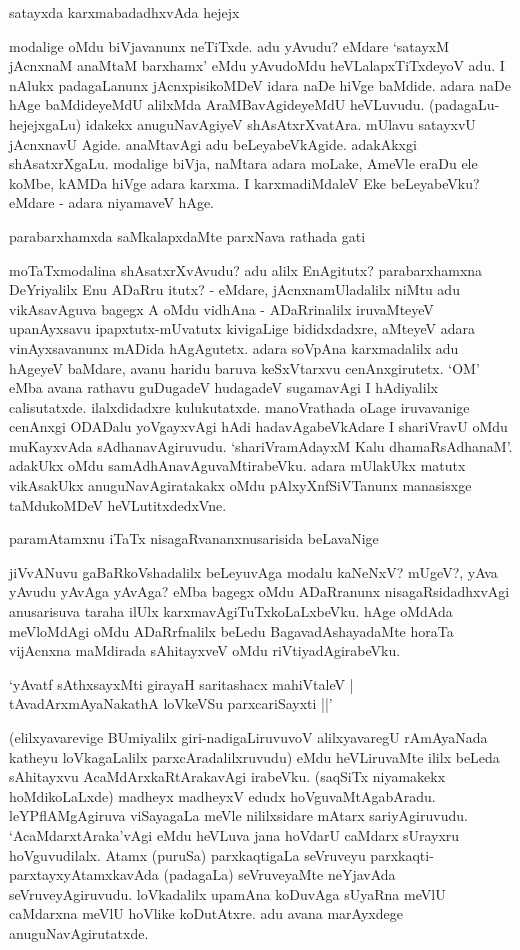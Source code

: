 satayxda karxmabadadhxvAda hejejx

modalige oMdu biVjavanunx neTiTxde. adu yAvudu? eMdare `satayxM jAcnxnaM anaMtaM barxhamx' eMdu yAvudoMdu heVLalapxTiTxdeyoV adu. I nAlukx padagaLanunx jAcnxpisikoMDeV idara naDe hiVge baMdide. adara naDe hAge baMdideyeMdU alilxMda AraMBavAgideyeMdU heVLuvudu. (padagaLu-hejejxgaLu) idakekx anuguNavAgiyeV shAsAtxrXvatAra. mUlavu satayxvU jAcnxnavU Agide. anaMtavAgi adu beLeyabeVkAgide. adakAkxgi shAsatxrXgaLu. modalige biVja, naMtara adara moLake, AmeVle eraDu ele koMbe, kAMDa hiVge adara karxma. I karxmadiMdaleV Eke beLeyabeVku? eMdare - adara niyamaveV hAge.

parabarxhamxda saMkalapxdaMte parxNava rathada gati

moTaTxmodalina shAsatxrXvAvudu? adu alilx EnAgitutx? parabarxhamxna DeYriyalilx Enu ADaRru itutx? - eMdare, jAcnxnamUladalilx niMtu adu vikAsavAguva bagegx A oMdu vidhAna - ADaRrinalilx iruvaMteyeV upanAyxsavu ipapxtutx-mUvatutx kivigaLige bididxdadxre, aMteyeV adara vinAyxsavanunx mADida hAgAgutetx. adara soVpAna karxmadalilx adu hAgeyeV baMdare, avanu haridu baruva keSxVtarxvu cenAnxgirutetx. `OM' eMba avana rathavu guDugadeV hudagadeV sugamavAgi I hAdiyalilx calisutatxde. ilalxdidadxre kulukutatxde. manoVrathada oLage iruvavanige cenAnxgi ODADalu yoVgayxvAgi hAdi hadavAgabeVkAdare I shariVravU oMdu muKayxvAda sAdhanavAgiruvudu. `shariVramAdayxM Kalu dhamaRsAdhanaM'. adakUkx oMdu samAdhAnavAguvaMtirabeVku. adara mUlakUkx matutx vikAsakUkx anuguNavAgiratakakx oMdu pAlxyXnfSiVTanunx manasisxge taMdukoMDeV heVLutitxdedxVne.

paramAtamxnu iTaTx nisagaRvananxnusarisida beLavaNige

jiVvANuvu gaBaRkoVshadalilx beLeyuvAga modalu kaNeNxV? mUgeV?, yAva yAvudu yAvAga yAvAga? eMba bagegx oMdu ADaRranunx nisagaRsidadhxvAgi anusarisuva taraha ilUlx karxmavAgiTuTxkoLaLxbeVku. hAge oMdAda meVloMdAgi oMdu ADaRrfnalilx beLedu BagavadAshayadaMte horaTa vijAcnxna maMdirada sAhitayxveV oMdu riVtiyadAgirabeVku.

\begin{shloka}
`yAvatf sAthxsayxMti girayaH saritashacx mahiVtaleV |\\
tAvadArxmAyaNakathA loVkeVSu parxcariSayxti ||'
\end{shloka}

(elilxyavarevige BUmiyalilx giri-nadigaLiruvuvoV alilxyavaregU rAmAyaNada katheyu loVkagaLalilx parxcAradalilxruvudu) eMdu heVLiruvaMte ililx beLeda sAhitayxvu AcaMdArxkaRtArakavAgi irabeVku. (saqSiTx niyamakekx hoMdikoLaLxde) madheyx madheyxV edudx hoVguvaMtAgabAradu. leYPflAMgAgiruva viSayagaLa meVle nililxsidare mAtarx sariyAgiruvudu. `AcaMdarxtAraka'vAgi eMdu heVLuva jana hoVdarU caMdarx sUrayxru hoVguvudilalx. Atamx (puruSa) parxkaqtigaLa seVruveyu parxkaqti-parxtayxyAtamxkavAda (padagaLa) seVruveyaMte neYjavAda seVruveyAgiruvudu. loVkadalilx upamAna koDuvAga sUyaRna meVlU caMdarxna meVlU hoVlike koDutAtxre. adu avana marAyxdege anuguNavAgirutatxde.

